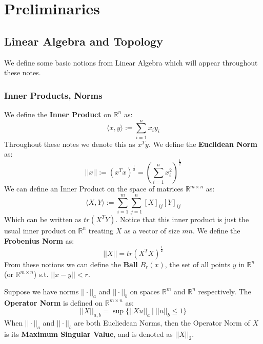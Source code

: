 \documentclass[]{article}
\theoremstyle{mattstyle}
\theoremstyle{definition}
\begin{document}
\newpage

\section{Preliminaries}

\subsection{Linear Algebra and Topology}

We define some basic notions from Linear Algebra which will appear throughout these notes.


\subsubsection{Inner Products, Norms}
We define the \textbf{Inner Product} on $\mathbb{R}^n$ as:
$$\langle x,y \rangle:=\sum_{i=1}^nx_iy_i$$
Throughout these notes we denote this as $x^Ty$. We define the \textbf{Euclidean Norm} as: 
$$||x||:=(x^Tx)^{\frac{1}{2}}=\left(\sum_{i=1}^n x_i^2\right)^{\frac{1}{2}}$$
We can define an Inner Product on the space of matrices $\mathbb{R}^{m\times n}$ as:
$$ \langle X,Y \rangle:=\sum_{i=1}^m\sum_{j=1}^n [X]_{ij}[Y]_{ij} $$
Which can be written as $tr(X^TY)$. Notice that this inner product is just the usual inner product on $\mathbb{R}^n$ treating $X$ as a vector of size $mn$. We define the \textbf{Frobenius Norm} as:
$$ ||X|| = tr(X^TX)^{\frac{1}{2}} $$
From these notions we can define the \textbf{Ball} $B_r(x)$, the set of all points $y$ in $\mathbb{R}^n$ (or $\mathbb{R}^{m\times n}$) s.t. $||x-y||<r$.

Suppose we have norms $||\cdot||_a$ and $||\cdot||_b$ on spaces $\mathbb{R}^m$ and $\mathbb{R}^n$ respectively. The \textbf{Operator Norm} is defined on $\mathbb{R}^{m\times n}$ as:
$$||X||_{a,b}=\sup\{||Xu||_a \ | \ ||u||_b \le 1 \}$$
When $||\cdot||_a$ and $||\cdot||_b$ are both Eucliedean Norms, then the Operator Norm of $X$ is its \textbf{Maximum Singular Value}, and is denoted as $||X||_2$.
\end{document}
